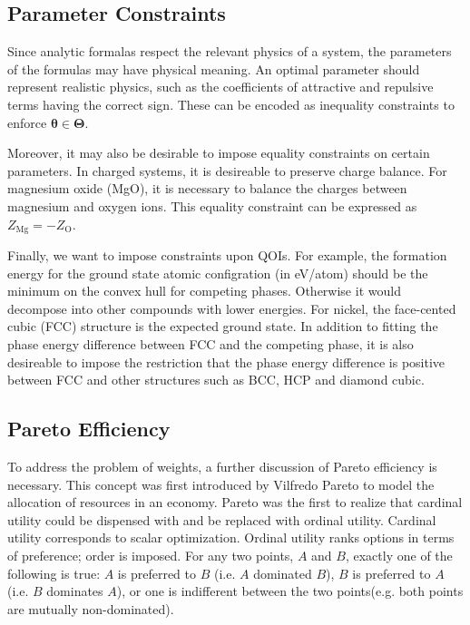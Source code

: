 \subsection{Parameter Constraints}

Since analytic formalas respect the relevant physics of a system, the parameters of the formulas may have physical meaning.  An optimal parameter should represent realistic physics, such as the coefficients of attractive and repulsive terms having the correct sign.  These can be encoded as inequality constraints to enforce $\bm{\theta} \in \bm{\Theta}$.

Moreover, it may also be desirable to impose equality constraints on certain parameters.  In charged systems, it is desireable to preserve charge balance.  For magnesium oxide (MgO), it is necessary to balance the charges between magnesium and oxygen ions.  This equality constraint can be expressed as $Z_{\text{Mg}} = -Z_{\text{O}}$.

Finally, we want to impose constraints upon QOIs.  For example, the formation energy for the ground state atomic configration (in eV/atom) should be the minimum on the convex hull for competing phases.  Otherwise it would decompose into other compounds with lower energies.  For nickel, the face-cented cubic (FCC) structure is the expected ground state.  In addition to fitting the phase energy difference between FCC and the competing phase, it is also desireable to impose the restriction that the phase energy difference is positive between FCC and other structures such as BCC, HCP and diamond cubic.

\subsection{Pareto Efficiency}
\label{sec:pareto_efficiency}

To address the problem of weights, a further discussion of Pareto efficiency is necessary. This concept was first introduced by Vilfredo Pareto to model the allocation of resources in an economy\cite{pareto1897_pareto}.  Pareto was the first to realize that cardinal utility could be dispensed with and be replaced with ordinal utility\cite{aspers2001_pareto}.  Cardinal utility corresponds to scalar optimization.  Ordinal utility ranks options in terms of preference; order is imposed.  For any two points, $A$ and $B$, exactly one of the following is true: $A$ is preferred to $B$ (i.e. $A$ dominated $B$), $B$ is preferred to $A$ (i.e. $B$ dominates $A$), or one is indifferent between the two points(e.g. both points are mutually non-dominated).

